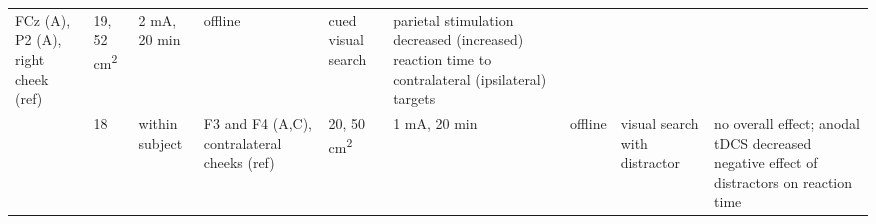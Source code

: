 \documentclass[11pt,]{memoir}
\begin{document}
\begin{longtable}[]{@{}lllllllll@{}}
\begin{minipage}[t]{0.15\columnwidth}
FCz (A), P2 (A), right cheek
(ref)\strut
\end{minipage} & \begin{minipage}[t]{0.04\columnwidth}\raggedright
19,
52
cm\textsuperscript{2}\strut
\end{minipage} & \begin{minipage}[t]{0.06\columnwidth}\raggedright
2 mA, 20
min\strut
\end{minipage} & \begin{minipage}[t]{0.05\columnwidth}\raggedright
offline\strut
\end{minipage} & \begin{minipage}[t]{0.06\columnwidth}\raggedright
cued
visual
search\strut
\end{minipage} & \begin{minipage}[t]{0.25\columnwidth}\raggedright
parietal stimulation decreased (increased)
reaction time to contralateral (ipsilateral)
targets\strut
\end{minipage}\tabularnewline
\begin{minipage}[t]{0.08\columnwidth}\raggedright
\textcite{Cosman2015}\strut
\end{minipage} & \begin{minipage}[t]{0.03\columnwidth}\raggedright
18\strut
\end{minipage} & \begin{minipage}[t]{0.05\columnwidth}\raggedright
within
subject\strut
\end{minipage} & \begin{minipage}[t]{0.15\columnwidth}\raggedright
F3 and F4 (A,C), contralateral
cheeks (ref)\strut
\end{minipage} & \begin{minipage}[t]{0.04\columnwidth}\raggedright
20,
50
cm\textsuperscript{2}\strut
\end{minipage} & \begin{minipage}[t]{0.06\columnwidth}\raggedright
1 mA, 20
min\strut
\end{minipage} & \begin{minipage}[t]{0.05\columnwidth}\raggedright
offline\strut
\end{minipage} & \begin{minipage}[t]{0.06\columnwidth}\raggedright
visual
search
with
distractor\strut
\end{minipage} & \begin{minipage}[t]{0.25\columnwidth}\raggedright
no overall effect; anodal tDCS decreased negative
effect of distractors on reaction time\strut

\end{minipage}
\end{longtable}
\end{document}
